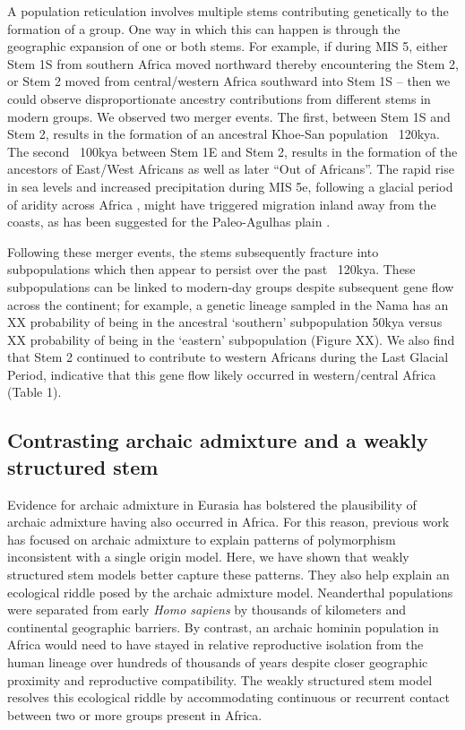 \documentclass[]{article}
\begin{document}
A population reticulation involves multiple stems contributing genetically to
the formation of a group. One way in which this can happen is through the
geographic expansion of one or both stems. For example, if during MIS 5, either
Stem 1S from southern Africa moved northward thereby encountering the Stem 2,
or Stem 2 moved from central/western Africa southward into Stem 1S -- then we
could observe disproportionate ancestry contributions from different stems in
modern groups. We observed two merger events. The first, between Stem 1S and
Stem 2, results in the formation of an ancestral Khoe-San population ~120kya.
The second ~100kya between Stem 1E and Stem 2, results in the formation of the
ancestors of East/West Africans as well as later “Out of Africans”.  The rapid
rise in sea levels and increased precipitation during MIS 5e, following a
glacial period of aridity across Africa \citep{Blome2012-lw}, might have
triggered migration inland away from the coasts, as has been suggested for the
Paleo-Agulhas plain \citep{Marean2014-pg}. 

Following these merger events, the stems subsequently fracture into
subpopulations which then appear to persist over the past ~120kya. These
subpopulations can be linked to modern-day groups despite subsequent gene flow
across the continent; for example, a genetic lineage sampled in the Nama has an
XX probability of being in the ancestral ‘southern’ subpopulation 50kya versus
XX probability of being in the ‘eastern’ subpopulation (Figure XX). We also
find that Stem 2 continued to contribute to western Africans during the Last
Glacial Period, indicative that this gene flow likely occurred in
western/central Africa (Table 1). 

\subsection*{Contrasting archaic admixture and a weakly structured stem}

Evidence for archaic admixture in Eurasia has bolstered the plausibility of
archaic admixture having also occurred in Africa. For this reason, previous
work has focused on archaic admixture to explain patterns of polymorphism
inconsistent with a single origin model. Here, we have shown that weakly
structured stem models better capture these patterns. They also help explain an
ecological riddle posed by the archaic admixture model. Neanderthal populations
were separated from early \emph{Homo sapiens} by thousands of kilometers and
continental geographic barriers. By contrast, an archaic hominin population in
Africa would need to have stayed in relative reproductive isolation from the
human lineage over hundreds of thousands of years despite closer geographic
proximity and reproductive compatibility. The weakly structured stem model
resolves this ecological riddle by accommodating continuous or recurrent
contact between two or more groups present in Africa.
\end{document}
